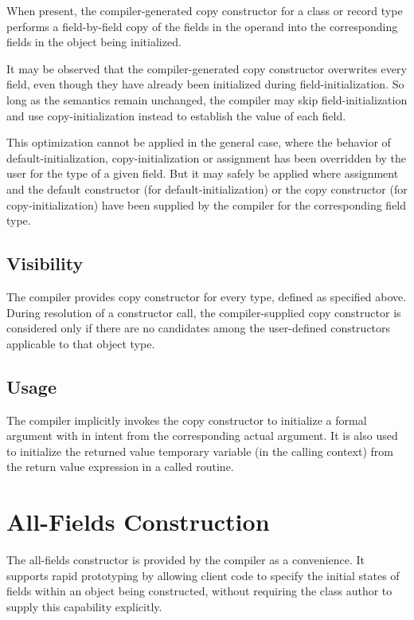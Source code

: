 When present, the compiler-generated copy constructor for a class or record type
performs a field-by-field copy of the fields in the operand into the
corresponding fields in the object being initialized.  

\begin{note}
It may be observed that the compiler-generated copy constructor overwrites every
field, even though they have already been initialized during
field-initialization.  So long as the semantics remain unchanged, the compiler
may skip field-initialization and use copy-initialization instead to establish
the value of each field.

This optimization cannot be applied in the general case, where the behavior of
default-initialization, copy-initialization or assignment has been overridden by
the user for the type of a given field.  But it may safely be applied where
assignment and the default constructor (for default-initialization) or the copy
constructor (for copy-initialization) have been supplied by the compiler for the
corresponding field type.
\end{note}

\subsection{Visibility}

The compiler provides copy constructor for every type, defined as specified
above.  During resolution of a constructor call, the compiler-supplied copy
constructor is considered only if there are no candidates among the user-defined
constructors applicable to that object type.

\subsection{Usage}

The compiler implicitly invokes the copy constructor to initialize a formal
argument with in intent from the corresponding actual argument.  It is also used
to initialize the returned value temporary variable (in the calling context)
from the return value expression in a called routine.

\section{All-Fields Construction}

The all-fields constructor is provided by the compiler as a convenience.  It
supports rapid prototyping by allowing client code to specify the initial states
of fields within an object being constructed, without requiring the class author
to supply this capability explicitly.


